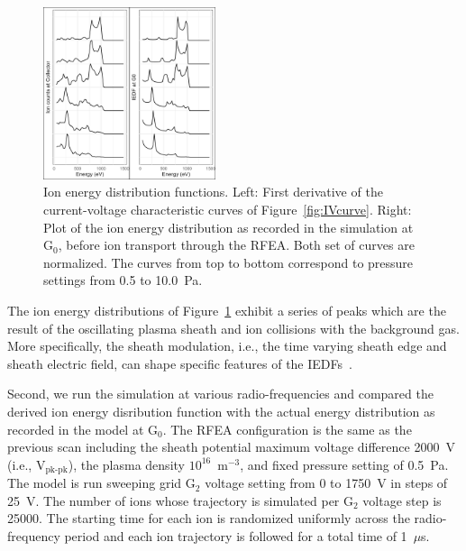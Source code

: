 \begin{figure}[htbp]
\centering
\includegraphics[width=0.45\textwidth]{Figures/PressureScan.jpeg}
\caption{Ion energy distribution functions. Left: First derivative of the current-voltage characteristic curves of Figure~\ref{fig:IVcurve}. Right: Plot of the ion energy distribution as recorded in the simulation at G$_0$, before ion transport through the RFEA. Both set of curves are normalized. The curves from top to bottom correspond to pressure settings from 0.5 to 10.0~Pa.}
\label{fig:PressureScan}
\end{figure}

The ion energy distributions of Figure~\ref{fig:PressureScan} exhibit a series of peaks which are the result of the oscillating plasma sheath and ion collisions with the background gas. More specifically, the sheath modulation, i.e., the time varying sheath edge and sheath electric field, can shape specific features of the IEDFs~\cite{Wild1989,Wild1991}. 




Second, we run the simulation at various radio-frequencies and compared the derived ion energy disribution function with the actual energy distribution as recorded in the model at G$_0$. The RFEA configuration is the same as the previous scan including the sheath potential maximum voltage difference 2000~V (i.e., V$_\text{pk-pk}$), the plasma density $10^{16}$~m$^{-3}$, and fixed pressure setting of 0.5~Pa. The model is run sweeping grid G$_2$ voltage setting from 0 to 1750~V in steps of 25~V. The number of ions whose trajectory is simulated per G$_2$ voltage step is 25000. The starting time for each ion is randomized uniformly across the radio-frequency period and each ion trajectory is followed for a total time of 1~$\mu$s. 

